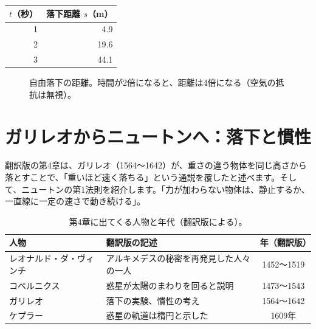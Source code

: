 \documentclass[a4paper,11pt,openany]{ltjsbook}
\begin{document}
\begin{center}
\begin{tabular}{rr}
\toprule
$t$（秒） & 落下距離 $s$（m）\\
\midrule
1 & 4.9\\
2 & 19.6\\
3 & 44.1\\
\bottomrule
\end{tabular}
\end{center}

\begin{figure}[htbp]
\centering
{}
\caption{自由落下の距離。時間が2倍になると、距離は4倍になる（空気の抵抗は無視）。}
\end{figure}


\section{ガリレオからニュートンへ：落下と慣性}

翻訳版の第4章は、ガリレオ（1564〜1642）が、重さの違う物体を同じ高さから落とすことで、「重いほど速く落ちる」という通説を覆したと述べます。そして、ニュートンの第1法則を紹介します。「力が加わらない物体は、静止するか、一直線に一定の速さで動き続ける」。

\begin{table}[htbp]
\centering
\begin{tabular}{llc}
\toprule
人物 & 翻訳版の記述 & 年（翻訳版）\\
\midrule
レオナルド・ダ・ヴィンチ & アルキメデスの秘密を再発見した人々の一人 & 1452〜1519\\
コペルニクス & 惑星が太陽のまわりを回ると説明 & 1473〜1543\\
ガリレオ & 落下の実験、慣性の考え & 1564〜1642\\
ケプラー & 惑星の軌道は楕円と示した & 1609年\\
\bottomrule
\end{tabular}
\caption{第4章に出てくる人物と年代（翻訳版による）。}
\end{table}
\end{document}
